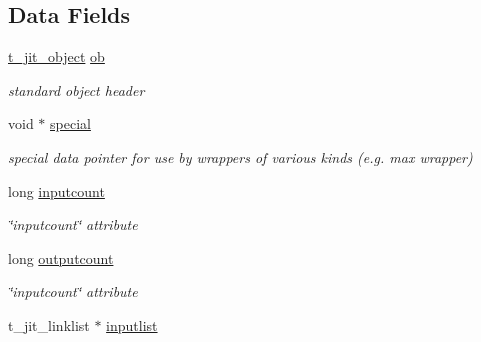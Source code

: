 \subsection*{Data Fields}
\begin{DoxyCompactItemize}
\item 
\hypertarget{structt__jit__mop_a995a6964563b32d4347cf72e232feb8c}{
\hyperlink{structt__object}{t\_\-jit\_\-object} \hyperlink{structt__jit__mop_a995a6964563b32d4347cf72e232feb8c}{ob}}
\label{structt__jit__mop_a995a6964563b32d4347cf72e232feb8c}

\begin{DoxyCompactList}\small\item\em standard object header \item\end{DoxyCompactList}\item 
\hypertarget{structt__jit__mop_a68fec2a5ae50dd3585f68581d64fabbc}{
void $\ast$ \hyperlink{structt__jit__mop_a68fec2a5ae50dd3585f68581d64fabbc}{special}}
\label{structt__jit__mop_a68fec2a5ae50dd3585f68581d64fabbc}

\begin{DoxyCompactList}\small\item\em special data pointer for use by wrappers of various kinds (e.g. max wrapper) \item\end{DoxyCompactList}\item 
\hypertarget{structt__jit__mop_a071e964679a4689436aef78fc96f17ea}{
long \hyperlink{structt__jit__mop_a071e964679a4689436aef78fc96f17ea}{inputcount}}
\label{structt__jit__mop_a071e964679a4689436aef78fc96f17ea}

\begin{DoxyCompactList}\small\item\em \char`\"{}inputcount\char`\"{} attribute \item\end{DoxyCompactList}\item 
\hypertarget{structt__jit__mop_a1b37539c55c94d669ae79aa0ac71da81}{
long \hyperlink{structt__jit__mop_a1b37539c55c94d669ae79aa0ac71da81}{outputcount}}
\label{structt__jit__mop_a1b37539c55c94d669ae79aa0ac71da81}

\begin{DoxyCompactList}\small\item\em \char`\"{}inputcount\char`\"{} attribute \item\end{DoxyCompactList}\item 
\hypertarget{structt__jit__mop_a8a9ba5c7e089c301115ffa966dda2bef}{
t\_\-jit\_\-linklist $\ast$ \hyperlink{structt__jit__mop_a8a9ba5c7e089c301115ffa966dda2bef}{inputlist}}
\label{structt__jit__mop_a8a9ba5c7e089c301115ffa966dda2bef}


\end{DoxyCompactItemize}
